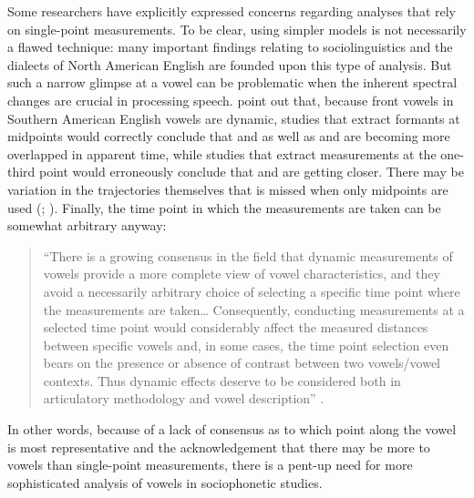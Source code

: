 Some researchers have explicitly expressed concerns regarding analyses that rely on single-point measurements. To be clear, using simpler models is not necessarily a flawed technique: many important findings relating to sociolinguistics and the dialects of North American English are founded upon this type of analysis. But such a narrow glimpse at a vowel can be problematic when the inherent spectral changes are crucial in processing speech. \citet{renwick_stanley_2020} point out that, because front vowels in Southern American English vowels are dynamic, studies that extract formants at midpoints would correctly conclude that \fleece and \kit as well as \face and \dress are becoming more overlapped in apparent time, while studies that extract measurements at the one-third point would erroneously conclude that \kit and \face are getting closer. There may be variation in the trajectories themselves that is missed when only midpoints are used (\citealt[57]{swan_2016_diss}; \citealt[288]{jacewicz_etal_2006}). Finally, the time point in which the measurements are taken can be somewhat arbitrary anyway:
\begin{quote}
    ``There is a growing consensus in the field that dynamic measurements of vowels provide a more complete view of vowel characteristics, and they avoid a necessarily arbitrary choice of selecting a specific time point where the measurements are taken… Consequently, conducting measurements at a selected time point would considerably affect the measured distances between specific vowels and, in some cases, the time point selection even bears on the presence or absence of contrast between two vowels/vowel contexts. Thus dynamic effects deserve to be considered both in articulatory methodology and vowel description'' \citep[330]{strycharczuk_scobbie_2017}.
\end{quote}
In other words, because of a lack of consensus as to which point along the vowel is most representative and the acknowledgement that there may be more to vowels than single-point measurements, there is a pent-up need for more sophisticated analysis of vowels in sociophonetic studies.


